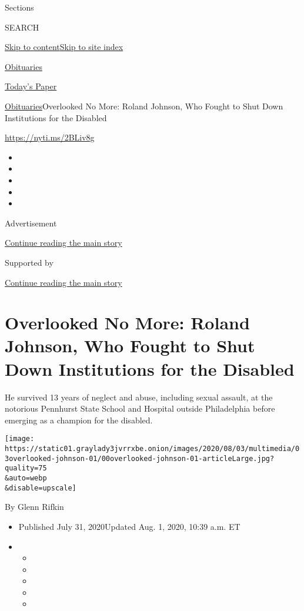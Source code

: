 Sections

SEARCH

\protect\hyperlink{site-content}{Skip to
content}\protect\hyperlink{site-index}{Skip to site index}

\href{https://www.nytimes3xbfgragh.onion/section/obituaries}{Obituaries}

\href{https://myaccount.nytimes3xbfgragh.onion/auth/login?response_type=cookie\&client_id=vi}{}

\href{https://www.nytimes3xbfgragh.onion/section/todayspaper}{Today's
Paper}

\href{/section/obituaries}{Obituaries}\textbar{}Overlooked No More:
Roland Johnson, Who Fought to Shut Down Institutions for the Disabled

\url{https://nyti.ms/2BLiv8g}

\begin{itemize}
\item
\item
\item
\item
\item
\end{itemize}

Advertisement

\protect\hyperlink{after-top}{Continue reading the main story}

Supported by

\protect\hyperlink{after-sponsor}{Continue reading the main story}

\hypertarget{overlooked-no-more-roland-johnson-who-fought-to-shut-down-institutions-for-the-disabled}{%
\section{Overlooked No More: Roland Johnson, Who Fought to Shut Down
Institutions for the
Disabled}\label{overlooked-no-more-roland-johnson-who-fought-to-shut-down-institutions-for-the-disabled}}

He survived 13 years of neglect and abuse, including sexual assault, at
the notorious Pennhurst State School and Hospital outside Philadelphia
before emerging as a champion for the disabled.

\texttt{[image: https://static01.graylady3jvrrxbe.onion/images/2020/08/03/multimedia/03overlooked-johnson-01/00overlooked-johnson-01-articleLarge.jpg?quality=75\\\&auto=webp\\\&disable=upscale]}

By Glenn Rifkin

\begin{itemize}
\item
  Published July 31, 2020Updated Aug. 1, 2020, 10:39 a.m. ET
\item
  \begin{itemize}
  \item
  \item
  \item
  \item
  \item
  \end{itemize}
\end{itemize}

